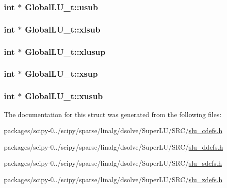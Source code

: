 \subsubsection[{usub}]{\setlength{\rightskip}{0pt plus 5cm}int $\ast$ Global\+L\+U\+\_\+t\+::usub}\label{structGlobalLU__t_a82284bf60f17d1e382e3a119f1cec460}
\hypertarget{structGlobalLU__t_a11adbaf38d57b4e811de9d124361f4d1}{}
\subsubsection[{xlsub}]{\setlength{\rightskip}{0pt plus 5cm}int $\ast$ Global\+L\+U\+\_\+t\+::xlsub}\label{structGlobalLU__t_a11adbaf38d57b4e811de9d124361f4d1}
\hypertarget{structGlobalLU__t_a12843837c9bb0679ca7f02d853667a85}{}
\subsubsection[{xlusup}]{\setlength{\rightskip}{0pt plus 5cm}int $\ast$ Global\+L\+U\+\_\+t\+::xlusup}\label{structGlobalLU__t_a12843837c9bb0679ca7f02d853667a85}
\hypertarget{structGlobalLU__t_afbf1224e8b84fe4228a346e8a15a201f}{}
\subsubsection[{xsup}]{\setlength{\rightskip}{0pt plus 5cm}int $\ast$ Global\+L\+U\+\_\+t\+::xsup}\label{structGlobalLU__t_afbf1224e8b84fe4228a346e8a15a201f}
\hypertarget{structGlobalLU__t_a062c5af94df0f66ab60439edd6516834}{}
\subsubsection[{xusub}]{\setlength{\rightskip}{0pt plus 5cm}int $\ast$ Global\+L\+U\+\_\+t\+::xusub}\label{structGlobalLU__t_a062c5af94df0f66ab60439edd6516834}


The documentation for this struct was generated from the following files\+:\begin{DoxyCompactItemize}
\item 
packages/scipy-\/0../scipy/sparse/linalg/dsolve/\+Super\+L\+U/\+S\+R\+C/\hyperlink{slu__cdefs_8h}{slu\+\_\+cdefs.\+h}\item 
packages/scipy-\/0../scipy/sparse/linalg/dsolve/\+Super\+L\+U/\+S\+R\+C/\hyperlink{slu__ddefs_8h}{slu\+\_\+ddefs.\+h}\item 
packages/scipy-\/0../scipy/sparse/linalg/dsolve/\+Super\+L\+U/\+S\+R\+C/\hyperlink{slu__sdefs_8h}{slu\+\_\+sdefs.\+h}\item 
packages/scipy-\/0../scipy/sparse/linalg/dsolve/\+Super\+L\+U/\+S\+R\+C/\hyperlink{slu__zdefs_8h}{slu\+\_\+zdefs.\+h}\end{DoxyCompactItemize}
